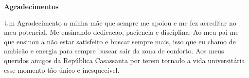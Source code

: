 
\begin{center}
\huge{{\bf Agradecimentos}}
\vspace{4cm}
\end{center}

Um Agradecimento a minha mãe que sempre me apoiou e me fez acreditar no meu potencial. Me ensinando dedicacao, paciencia e disciplina.
Ao meu pai me que ensinou a não estar satisfeito e buscar sempre mais, isso que eu chamo de ambicão e energia para sempre buscar sair da zona de conforto.
Aos meus queridos amigos da República Casassanta por terem tornado a vida universitária esse momento tão único e inesquecível.
 
\clearpage
\thispagestyle{empty}
\cleardoublepage